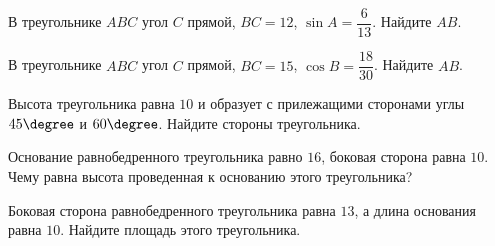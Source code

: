 \begin{homework}[number=3]
	\begin{listofex}
		\item В треугольнике \( ABC \) угол \( C \) прямой, \( BC=12 \), \( \sin A=\dfrac{6}{13} \). Найдите \( AB \).
		\item В треугольнике \( ABC \) угол \( C \) прямой, \( BC=15 \), \( \cos B=\dfrac{18}{30} \). Найдите \( AB \).
		\item  Высота треугольника равна \( 10 \) и образует с прилежащими сторонами углы \( 45\degree \) и \( 60\degree \). Найдите стороны треугольника.
		\item Основание равнобедренного треугольника равно \( 16 \), боковая сторона равна \( 10 \). Чему равна высота проведенная к основанию этого треугольника?
		\item Боковая сторона равнобедренного треугольника равна \( 13 \), а длина основания равна \( 10 \). Найдите площадь этого треугольника.
	\end{listofex}
\end{homework}

